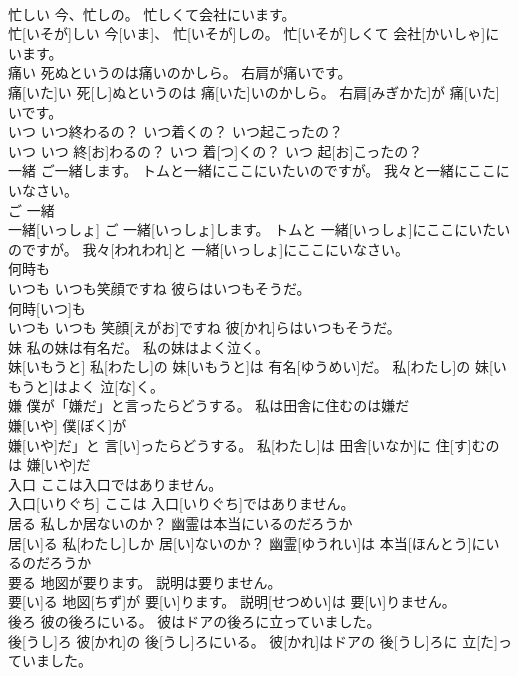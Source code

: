 \documentclass[8pt]{extreport}
\begin{document}
\begin{CJK}{UTF8}{min}
\\	忙しい 今、忙しの。 忙しくて会社にいます。	
\\	忙[いそが]しい 今[いま]、 忙[いそが]しの。 忙[いそが]しくて 会社[かいしゃ]にいます。
\\	痛い 死ぬというのは痛いのかしら。 右肩が痛いです。	
\\	痛[いた]い 死[し]ぬというのは 痛[いた]いのかしら。 右肩[みぎかた]が 痛[いた]いです。
\\	いつ いつ終わるの？ いつ着くの？ いつ起こったの？	
\\	いつ いつ 終[お]わるの？ いつ 着[つ]くの？ いつ 起[お]こったの？
\\	一緒 ご一緒します。 トムと一緒にここにいたいのですが。 我々と一緒にここにいなさい。	
\\	ご 一緒 
\\	一緒[いっしょ] ご 一緒[いっしょ]します。 トムと 一緒[いっしょ]にここにいたいのですが。 我々[われわれ]と 一緒[いっしょ]にここにいなさい。
\\	何時も
\\	いつも いつも笑顔ですね 彼らはいつもそうだ。	
\\	何時[いつ]も
\\	いつも いつも 笑顔[えがお]ですね 彼[かれ]らはいつもそうだ。
\\	妹 私の妹は有名だ。 私の妹はよく泣く。	
\\	妹[いもうと] 私[わたし]の 妹[いもうと]は 有名[ゆうめい]だ。 私[わたし]の 妹[いもうと]はよく 泣[な]く。
\\	嫌 僕が「嫌だ」と言ったらどうする。 私は田舎に住むのは嫌だ	
\\	嫌[いや] 僕[ぼく]が 
\\	嫌[いや]だ」と 言[い]ったらどうする。 私[わたし]は 田舎[いなか]に 住[す]むのは 嫌[いや]だ
\\	入口 ここは入口ではありません。	
\\	入口[いりぐち] ここは 入口[いりぐち]ではありません。
\\	居る 私しか居ないのか？ 幽霊は本当にいるのだろうか	
\\	居[い]る 私[わたし]しか 居[い]ないのか？ 幽霊[ゆうれい]は 本当[ほんとう]にいるのだろうか
\\	要る 地図が要ります。 説明は要りません。	
\\	要[い]る 地図[ちず]が 要[い]ります。 説明[せつめい]は 要[い]りません。
\\	後ろ 彼の後ろにいる。 彼はドアの後ろに立っていました。	
\\	後[うし]ろ 彼[かれ]の 後[うし]ろにいる。 彼[かれ]はドアの 後[うし]ろに 立[た]っていました。

\end{CJK}
\end{document}

